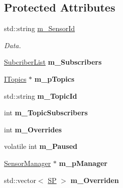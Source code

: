 \subsection*{Protected Attributes}
\begin{DoxyCompactItemize}
\item 
\mbox{\label{class_i_sensor_acc53fe34c8f2ed7459b78c152d497ed3}} 
std\+::string \hyperlink{class_i_sensor_acc53fe34c8f2ed7459b78c152d497ed3}{m\+\_\+\+Sensor\+Id}
\begin{DoxyCompactList}\small\item\em Data. \end{DoxyCompactList}\item 
\mbox{\label{class_i_sensor_a7ad80113996c9830d323276a924785de}} 
\hyperlink{class_i_sensor_adb8f7745f3eb22b0b840d3fb6aea0c1d}{Subcriber\+List} {\bfseries m\+\_\+\+Subscribers}
\item 
\mbox{\label{class_i_sensor_a417f58c50ef50fbbd1010b122a3a0cad}} 
\hyperlink{class_i_topics}{I\+Topics} $\ast$ {\bfseries m\+\_\+p\+Topics}
\item 
\mbox{\label{class_i_sensor_aa27388f60fc66b577f99cb85316fa967}} 
std\+::string {\bfseries m\+\_\+\+Topic\+Id}
\item 
\mbox{\label{class_i_sensor_ab7351a332130af98f5e20db824e30858}} 
int {\bfseries m\+\_\+\+Topic\+Subscribers}
\item 
\mbox{\label{class_i_sensor_a0221d3569177b541ba346b3e263c8a54}} 
int {\bfseries m\+\_\+\+Overrides}
\item 
\mbox{\label{class_i_sensor_a179ba52b0ff7480cce3270125c0c4eb4}} 
volatile int {\bfseries m\+\_\+\+Paused}
\item 
\mbox{\label{class_i_sensor_a2cb2c283760f825cccd4c5cf0ae82f1e}} 
\hyperlink{class_sensor_manager}{Sensor\+Manager} $\ast$ {\bfseries m\+\_\+p\+Manager}
\item 
\mbox{\label{class_i_sensor_aa57994e831bcd2cee9646a2bc8972c8f}} 
std\+::vector$<$ \hyperlink{class_i_sensor_a9c8b231fdda50c9d368e47ef5b9d0faf}{SP} $>$ {\bfseries m\+\_\+\+Overriden}
\end{DoxyCompactItemize}


